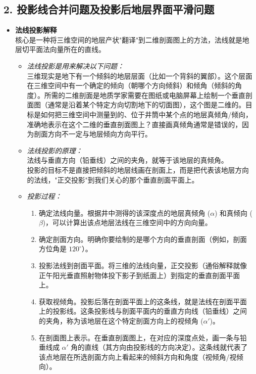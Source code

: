 \documentclass[a4paper,twoside]{ctexart}
\begin{document}
\subsection*{2. 投影线合并问题及投影后地层界面平滑问题}
\begin{itemize}
  \item \textbf{法线投影解释}\\
  核心是一种将三维空间的地层产状"翻译"到二维剖面图上的方法，法线就是地层切平面法向量所在的直线。
  
  \begin{itemize}
    \item \textit{法线投影是用来解决以下问题：}\\
    三维现实是地下有一个倾斜的地层层面（比如一个背斜的翼部）。这个层面在三维空间中有一个确定的倾向（朝哪个方向倾斜）和倾角（倾斜的角度）。所需的二维剖面是地质学家需要在图纸或电脑屏幕上绘制一个垂直剖面图（通常是沿着某个特定方向切割地下的切面图），这个图是二维的。目标是如何把三维空间中测量到的、位于井筒中某个点的地层真倾角/倾向，准确地表示在这个二维的垂直剖面图上？直接画真倾角通常是错误的，因为剖面方向不一定与地层倾向方向平行。
    
    \item \textit{法线投影的原理：}\\
    法线与垂直方向（铅垂线）之间的夹角，就等于该地层的真倾角。\\
    投影的目标不是直接把倾斜的地层线画在剖面上，而是把代表该地层方向的法线，"正交投影"到我们关心的那个垂直剖面平面上。
    
    \item \textit{投影过程：}
    \begin{enumerate}
      \item 确定法线向量。根据井中测得的该深度点的地层真倾角 ($\alpha$) 和真倾向 ($\beta$)，可以计算出该点地层法线在三维空间中的方向向量。
      \item 确定剖面方向。明确你要绘制的是哪个方向的垂直剖面（例如，剖面方位角是 $120^\circ$）。
      \item 投影法线到剖面平面。将三维的法线向量，正交投影（通俗解释就像正午阳光垂直照射物体投下影子到纸面上）到指定的垂直剖面平面上。
      \item 获取视倾角。投影后落在剖面平面上的这条线，就是法线在剖面平面上的投影线。这条投影线与剖面平面内的垂直方向线（铅垂线）之间的夹角，称为该地层在这个特定剖面方向上的视倾角 ($\alpha'$)。
      \item 在剖面图上表示。在垂直剖面图上，在对应的深度点处，画一条与铅垂线成 $\alpha'$ 角的直线（其方向由投影线的方向决定）。这条线就代表了该点地层在所选剖面方向上看起来的倾斜方向和角度（视倾角/视倾向）。
    \end{enumerate}
    

\end{itemize}
\end{itemize}
\end{document}
